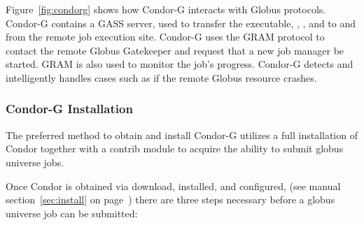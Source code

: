 Figure~\ref{fig:condorg} shows how Condor-G interacts with Globus protocols.
Condor-G contains a GASS server, used to transfer the executable,
, , and  to and from
the remote job execution site.
Condor-G uses the GRAM protocol to contact the remote Globus Gatekeeper
and request that a new job manager be started.
GRAM is also used to monitor the job's progress.
Condor-G detects and intelligently handles cases
such as if the remote Globus resource crashes.

\subsubsection{\label{sec:Condor-G-Install}Condor-G Installation}
The preferred method to obtain and install Condor-G
utilizes a full installation
of Condor together with a contrib module to acquire the
ability to submit globus universe jobs.

Once Condor is obtained via download, installed, and configured,
(see manual
section~\ref{sec:install} on page~\pageref{sec:install})
there are three steps necessary before a globus universe job
can be submitted:

